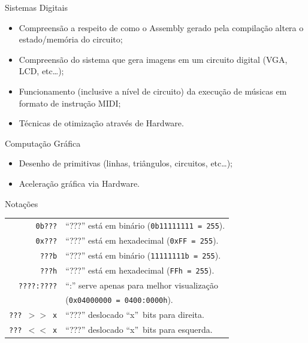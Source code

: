 \documentclass{beamer}
\begin{document}
\begin{darkframes}
\begin{frame}{Sistemas Digitais}
    \begin{itemize}
        \item Compreensão a respeito de como o Assembly gerado pela
            compilação altera o estado/memória do circuito;
        \item Compreensão do sistema que gera imagens em um circuito
            digital (VGA, LCD, etc\ldots);
        \item Funcionamento (inclusive a nível de circuito) da execução de
            músicas em formato de instrução MIDI\@;
        \item Técnicas de otimização através de Hardware.
    \end{itemize}
\end{frame}

\begin{frame}{Computação Gráfica}
    \begin{itemize}
        \item Desenho de primitivas (linhas, triângulos, circuitos, etc\ldots);
        \item Aceleração gráfica via Hardware.
    \end{itemize}
\end{frame}

\begin{frame}{Notações}
    \begin{center}
        \begin{tabular}{r|l}
            \texttt{0b???}      & \enquote{???} está em binário (\texttt{0b11111111 = 255}).\\
            \texttt{0x???}      & \enquote{???} está em hexadecimal (\texttt{0xFF = 255}).\\
            \texttt{???b}       & \enquote{???} está em binário (\texttt{11111111b = 255}).\\
            \texttt{???h}       & \enquote{???} está em hexadecimal (\texttt{FFh = 255}).\\
            \texttt{????:????}  & \enquote{:} serve apenas para melhor visualização \\
                                & (\texttt{0x04000000 = 0400:0000h}).\\
            \texttt{??? $>>$ x} & \enquote{???} deslocado ``x''\ bits para direita.\\
            \texttt{??? $<<$ x} & \enquote{???} deslocado ``x''\ bits para esquerda.\\
        \end{tabular}
    \end{center}
\end{frame}



\end{darkframes}
\end{document}
